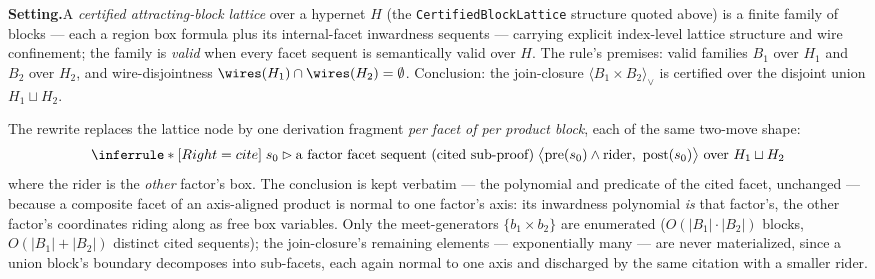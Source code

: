 

\textbf{Setting.}\enspace A \emph{certified attracting-block lattice}
over a hypernet $H$ (the \texttt{CertifiedBlockLattice} structure
quoted above) is a finite family of blocks --- each a region box
formula plus its internal-facet inwardness sequents --- carrying
explicit index-level lattice structure and wire confinement; the family
is \emph{valid} when every facet sequent is semantically valid over
$H$. The rule's premises: valid families $B_1$ over $H_1$ and $B_2$
over $H_2$, and wire-disjointness
$\wires(H_1) \cap \wires(H_2) = \emptyset$. Conclusion: the
join-closure $\langle B_1 \times B_2 \rangle_{\vee}$ is certified over
the disjoint union $H_1 \sqcup H_2$.

\begin{brecipe}\label{rec:pl-instance}
The rewrite replaces the lattice node by one derivation fragment
\emph{per facet of per product block}, each of the same two-move shape:
\[
\inferrule*[Right=cite]{\;s_0 \rhd \text{a factor facet sequent (cited sub-proof)}\;}{\bigl\langle \mathrm{pre}(s_0) \wedge \mathrm{rider},\ \mathrm{post}(s_0) \bigr\rangle \ \text{over } H_1 \sqcup H_2}
\]
where the rider is the \emph{other} factor's box. The conclusion is
kept verbatim --- the polynomial and predicate of the cited facet,
unchanged --- because a composite facet of an axis-aligned product is
normal to one factor's axis: its inwardness polynomial \emph{is} that
factor's, the other factor's coordinates riding along as free box
variables. Only the meet-generators $\{b_1 \times b_2\}$ are
enumerated ($O(|B_1| \cdot |B_2|)$ blocks, $O(|B_1| + |B_2|)$
distinct cited sequents); the join-closure's remaining elements ---
exponentially many --- are never materialized, since a union block's
boundary decomposes into sub-facets, each again normal to one axis and
discharged by the same citation with a smaller rider.
\end{brecipe}

